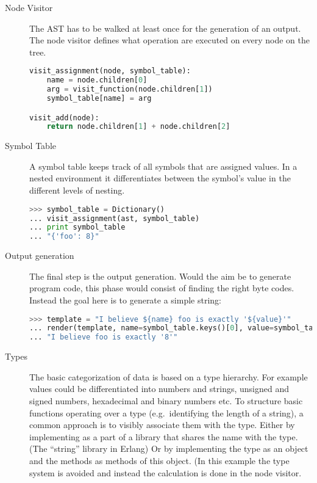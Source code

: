 \documentclass{scrartcl}
\begin{document}
\begin{description}
    \item[Node Visitor] The AST has to be walked at least once for the
        generation of an output. The node visitor %
        defines what operation are executed on every node on the tree.
        \begin{lstlisting}[language=py, caption=Pseudo Code Node visitor]
visit_assignment(node, symbol_table):
    name = node.children[0]
    arg = visit_function(node.children[1])
    symbol_table[name] = arg

visit_add(node):
    return node.children[1] + node.children[2]
        \end{lstlisting}
    \item[Symbol Table] A symbol table keeps track of all symbols that are
        assigned values. In a nested environment it differentiates between the
        symbol's value in the different levels of nesting.

        \begin{lstlisting}[language=py, caption=Symbol table contents]
>>> symbol_table = Dictionary()
... visit_assignment(ast, symbol_table)
... print symbol_table
... "{'foo': 8}"
        \end{lstlisting}

    \item[Output generation] The final step is the output generation.
        Would the aim be to generate program code, this phase would consist of
        finding the right byte codes. Instead the goal here is to generate a
        simple string:

        \begin{lstlisting}[language=py,caption=Pseudo code template rendering]
>>> template = "I believe ${name} foo is exactly '${value}'"
... render(template, name=symbol_table.keys()[0], value=symbol_table.values()[0])
... "I believe foo is exactly '8'"
        \end{lstlisting}

    \item[Types] The basic categorization of data is based on a type hierarchy.
        For example values could be differentiated into numbers and strings,
        unsigned and signed numbers, hexadecimal and binary numbers etc. To
        structure basic functions operating over a type (e.g.\ identifying the
        length of a string), a common approach is to visibly associate them
        with the type. Either by implementing as a part of a library that
        shares the name with the type. (The ``string'' library in Erlang) Or by
        implementing the type as an object and the methods as methods of this
        object. (In this example the type system is avoided and instead the
        calculation is done in the node visitor.
\end{description}
\end{document}
